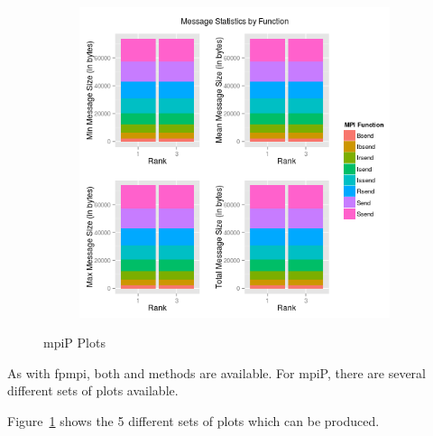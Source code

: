\begin{figure}
\begin{subfigure}[b]{0.485\textwidth}
        \end{subfigure}\\
        \begin{subfigure}[b]{0.485\textwidth}
            \includegraphics[width=\textwidth]{include/pics/mpip/05_message2}
        \end{subfigure}%
        \caption{mpiP Plots}
        \label{fig:mpip}
\end{figure}


As with fpmpi, both  and  methods are available.  For mpiP, there are several different sets of plots available.

Figure~\ref{fig:mpip} shows the 5 different sets of plots which can be produced.